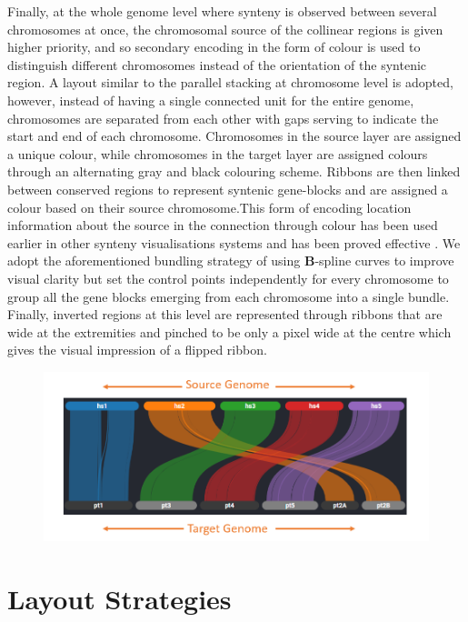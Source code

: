 Finally, at the whole genome level where synteny is observed between several chromosomes at once, the chromosomal source of the collinear regions is given higher priority, and so secondary encoding in the form of colour is used to distinguish different chromosomes instead of the orientation of the syntenic region. A layout similar to the parallel stacking at chromosome level is adopted, however, instead of having a single connected unit for the entire genome, chromosomes are separated from each other with gaps serving to indicate the start and end of each chromosome. Chromosomes in the source layer are assigned a unique colour, while chromosomes in the target layer are assigned colours through an alternating gray and black colouring scheme. Ribbons are then linked between conserved regions to represent syntenic gene-blocks and are assigned a colour based on their source chromosome.This form of encoding location information about the source in the connection through colour has been used earlier in other synteny visualisations systems and has been proved effective \cite{Meyer2009}. We adopt the aforementioned bundling strategy of using \textbf{B}-spline curves\cite{ref851370272} to improve visual clarity but set the control points independently for every chromosome to group all the gene blocks emerging from each chromosome into a single bundle. Finally, inverted regions at this level are represented through ribbons that are wide at the extremities and pinched to be only a pixel wide at the centre which gives the visual impression of a flipped ribbon.


\begin{figure}[ht]
  \centering
  \includegraphics[width=.75\linewidth]{images/ch_4_genome_level.PNG}
  \label{fig:ch_4_genome_level}
\end{figure}



\section{Layout Strategies}


